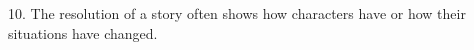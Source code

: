 \documentclass[12pt]{article}
\begin{document}
10. The resolution of a story often shows how characters have \underline{\hspace{4cm}} or how their situations have changed.  
\vspace{2cm}





\end{document}
